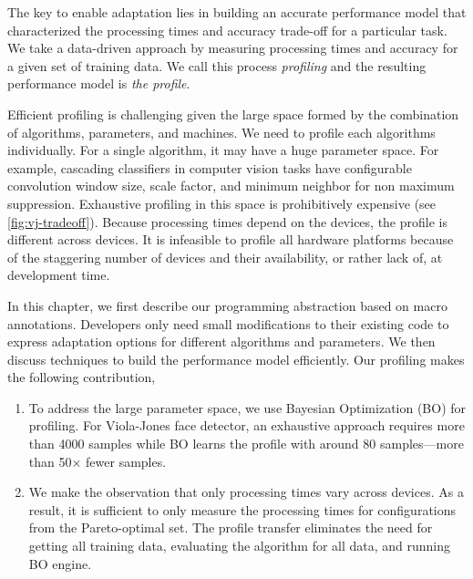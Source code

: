 The key to enable adaptation lies in building an accurate performance model that
characterized the processing times and accuracy trade-off for a particular
task. We take a data-driven approach by measuring processing times and accuracy
for a given set of training data. We call this process \emph{profiling} and the
resulting performance model is \emph{the profile}.

Efficient profiling is challenging given the large space formed by the
combination of algorithms, parameters, and machines. We need to profile each
algorithms individually. For a single algorithm, it may have a huge parameter
space. For example, cascading classifiers in computer vision tasks have
configurable convolution window size, scale factor, and minimum neighbor for non
maximum suppression. Exhaustive profiling in this space is prohibitively
expensive (see \autoref{fig:vj-tradeoff}). Because processing times depend on
the devices, the profile is different across devices. It is infeasible to
profile all hardware platforms because of the staggering number of devices and
their availability, or rather lack of, at development time.

In this chapter, we first describe our programming abstraction based on macro
annotations. Developers only need small modifications to their existing code to
express adaptation options for different algorithms and parameters. We then
discuss techniques to build the performance model efficiently. Our profiling
makes the following contribution,

\begin{enumerate}[noitemsep, topsep=0pt]
\item To address the large parameter space, we use Bayesian Optimization (BO)
  for profiling. For Viola-Jones face detector, an exhaustive approach requires
  more than 4000 samples while BO learns the profile with around 80
  samples---more than 50$\times$ fewer samples.
\item We make the observation that only processing times vary across devices. As
  a result, it is sufficient to only measure the processing times for
  configurations from the Pareto-optimal set. The profile transfer eliminates
  the need for getting all training data, evaluating the algorithm for all data,
  and running BO engine.
\end{enumerate}

